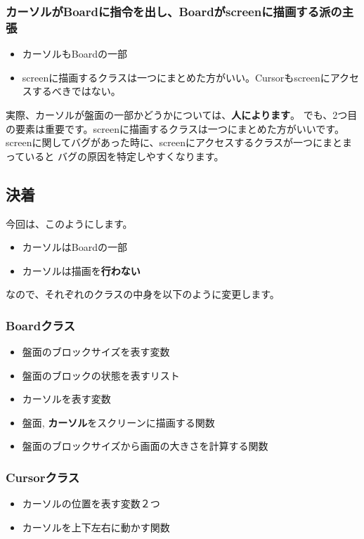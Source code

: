 \subsubsection{カーソルがBoardに指令を出し、Boardがscreenに描画する派の主張}
\begin{itemize}
  \item カーソルもBoardの一部
  \item screenに描画するクラスは一つにまとめた方がいい。Cursorもscreenにアクセスするべきではない。
\end{itemize}
実際、カーソルが盤面の一部かどうかについては、\textbf{人によります}。
でも、2つ目の要素は重要です。screenに描画するクラスは一つにまとめた方がいいです。
screenに関してバグがあった時に、screenにアクセスするクラスが一つにまとまっていると
バグの原因を特定しやすくなります。

\subsection{決着}
今回は、このようにします。
\begin{itemize}
  \item カーソルはBoardの一部
  \item カーソルは描画を\textbf{行わない}
\end{itemize}
なので、それぞれのクラスの中身を以下のように変更します。
\subsubsection{Boardクラス}
\begin{itemize}
  \item 盤面のブロックサイズを表す変数
  \item 盤面のブロックの状態を表すリスト
  \item カーソルを表す変数
  \item 盤面, \textbf{カーソル}をスクリーンに描画する関数
  \item 盤面のブロックサイズから画面の大きさを計算する関数
\end{itemize}

\subsubsection{Cursorクラス}
\begin{itemize}
  \item カーソルの位置を表す変数２つ
  \item カーソルを上下左右に動かす関数
\end{itemize}

